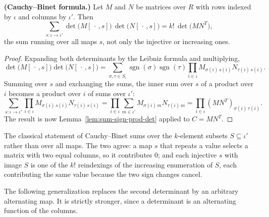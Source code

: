 \begin{proposition}
\label{lem:cauchy-binet}





\textbf{(Cauchy--Binet formula.)} Let $M$ and $N$ be matrices over $R$ with rows indexed by $\iota$ and columns by $\iota'$. Then
\[
\sum_{s \colon \iota \to \iota'} \det\big(M[\,\cdot\,, s]\big)\,\det\big(N[\,\cdot\,, s]\big) = k!\,\det\big(MN^{T}\big),
\]
the sum running over all maps $s$, not only the injective or increasing ones.
\end{proposition}
\begin{proof}

Expanding both determinants by the Leibniz formula and multiplying,
\[
\det\big(M[\,\cdot\,, s]\big)\det\big(N[\,\cdot\,, s]\big) = \sum_{\sigma, \tau \in S_\iota} \operatorname{sgn}(\sigma)\operatorname{sgn}(\tau) \prod_{i \in \iota} M_{\sigma(i)\,s(i)} N_{\tau(i)\,s(i)} .
\]
Summing over $s$ and exchanging the sums, the inner sum over $s$ of a product over $i$ becomes a product over $i$ of sums over $\iota'$:
\[
\sum_{s \colon \iota \to \iota'} \prod_{i \in \iota} M_{\sigma(i)\,s(i)} N_{\tau(i)\,s(i)} = \prod_{i \in \iota} \sum_{m \in \iota'} M_{\sigma(i)\,m} N_{\tau(i)\,m} = \prod_{i \in \iota} (MN^{T})_{\sigma(i)\,\tau(i)} .
\]
The result is now Lemma~\ref{lem:sum-sign-prod-det} applied to $C = MN^{T}$.
\end{proof}

The classical statement of Cauchy--Binet sums over the $k$-element subsets $S \subseteq \iota'$ rather than over all maps. The two agree: a map $s$ that repeats a value selects a matrix with two equal columns, so it contributes $0$; and each injective $s$ with image $S$ is one of the $k!$ reindexings of the increasing enumeration of $S$, each contributing the same value because the two sign changes cancel.

The following generalization replaces the second determinant by an arbitrary alternating map. It is strictly stronger, since a determinant is an alternating function of the columns.

